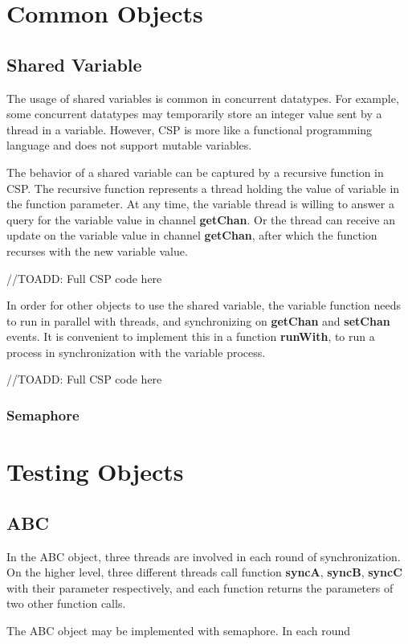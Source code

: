 \documentclass{article}
\begin{document}
\section{Common Objects}
\subsection{Shared Variable}
The usage of shared variables is common in concurrent datatypes. For example, some concurrent datatypes may temporarily store an integer value sent by a thread in a variable. However, CSP is more like a functional programming language and does not support mutable variables. 

The behavior of a shared variable can be captured by a recursive function in CSP. The recursive function represents a thread holding the value of variable in the function parameter. At any time, the variable thread is willing to answer a query for the variable value in channel \textbf{getChan}. Or the thread can receive an update on the variable value in channel \textbf{getChan}, after which the function recurses with the new variable value.

//TOADD: Full CSP code here

In order for other objects to use the shared variable, the variable function needs to run in parallel with threads, and synchronizing on \textbf{getChan} and \textbf{setChan} events. It is convenient to implement this in a function \textbf{runWith}, to run a process in synchronization with the variable process.

//TOADD: Full CSP code here

\subsubsection{Semaphore}


\section{Testing Objects}
\subsection{ABC}
In the ABC object, three threads are involved in each round of synchronization. On the higher level, three different threads call function \textbf{syncA}, \textbf{syncB}, \textbf{syncC} with their parameter respectively, and each function returns the parameters of two other function calls.

The ABC object may be implemented with semaphore. In each round
\end{document}

